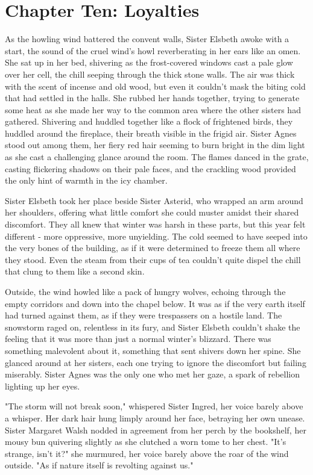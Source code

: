 \documentclass[11pt]{article}
\begin{document}
\section{Chapter Ten: Loyalties}
\label{sec:org5971ce2}
As the howling wind battered the convent walls, Sister Elsbeth awoke with a start, the sound of the cruel wind's howl reverberating in her ears like an omen. She sat up in her bed, shivering as the frost-covered windows cast a pale glow over her cell, the chill seeping through the thick stone walls. The air was thick with the scent of incense and old wood, but even it couldn't mask the biting cold that had settled in the halls. She rubbed her hands together, trying to generate some heat as she made her way to the common area where the other sisters had gathered. Shivering and huddled together like a flock of frightened birds, they huddled around the fireplace, their breath visible in the frigid air. Sister Agnes stood out among them, her fiery red hair seeming to burn bright in the dim light as she cast a challenging glance around the room. The flames danced in the grate, casting flickering shadows on their pale faces, and the crackling wood provided the only hint of warmth in the icy chamber.

Sister Elsbeth took her place beside Sister Asterid, who wrapped an arm around her shoulders, offering what little comfort she could muster amidst their shared discomfort. They all knew that winter was harsh in these parts, but this year felt different - more oppressive, more unyielding. The cold seemed to have seeped into the very bones of the building, as if it were determined to freeze  them all where they stood. Even the steam from their cups of tea couldn't quite dispel the chill that clung to them like a second skin.

Outside, the wind howled like a pack of hungry wolves, echoing through the empty corridors and down into the chapel below. It was as if the very earth itself had turned against them, as if they were trespassers on a hostile land. The snowstorm raged on, relentless in its fury, and Sister Elsbeth couldn't shake the feeling that it was more than just a normal winter's blizzard. There was something malevolent about it, something that sent shivers down her spine. She glanced around at her sisters, each one trying to ignore the discomfort but failing miserably. Sister Agnes was the only one who met her gaze, a spark of rebellion lighting up her eyes.

"The storm will not break soon," whispered Sister Ingred, her voice barely above a whisper. Her dark hair hung limply around her face, betraying her own unease. Sister Margaret Walsh nodded in agreement from her perch by the bookshelf, her mousy bun quivering slightly as she clutched a worn tome to her chest. "It's strange, isn't it?" she murmured, her voice barely above the roar of the wind outside. "As if nature itself is revolting against us."
\end{document}
